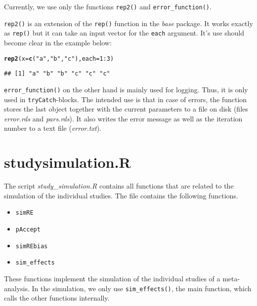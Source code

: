 \documentclass[letterpaper, 12pt]{article}\usepackage[]{graphicx}\usepackage[]{xcolor}
\makeatletter
\newcommand{\hlnum}[1]{\textcolor[rgb]{0.686,0.059,0.569}{#1}}%
\newcommand{\hlstr}[1]{\textcolor[rgb]{0.192,0.494,0.8}{#1}}%
\newcommand{\hlopt}[1]{\textcolor[rgb]{0,0,0}{#1}}%
\newcommand{\hlstd}[1]{\textcolor[rgb]{0.345,0.345,0.345}{#1}}%
\newcommand{\hlkwc}[1]{\textcolor[rgb]{0.333,0.667,0.333}{#1}}%
\newcommand{\hlkwd}[1]{\textcolor[rgb]{0.737,0.353,0.396}{\textbf{#1}}}%
\newenvironment{kframe}{%
 \def\at@end@of@kframe{}%
 \ifinner\ifhmode%
  \def\at@end@of@kframe{\end{minipage}}%
  \begin{minipage}{\columnwidth}%
 \fi\fi%
 \def\FrameCommand##1{\hskip\@totalleftmargin \hskip-\fboxsep
 \colorbox{shadecolor}{##1}\hskip-\fboxsep
     \hskip-\linewidth \hskip-\@totalleftmargin \hskip\columnwidth}%
 \MakeFramed {\advance\hsize-\width
   \@totalleftmargin\z@ \linewidth\hsize
   \@setminipage}}%
 {\par\unskip\endMakeFramed%
 \at@end@of@kframe}
\newenvironment{knitrout}{}{} %
\makeatother
\begin{document}
Currently, we use only the functions \texttt{rep2()} and
\texttt{error\_function()}.

\texttt{rep2()} is an extension of the \texttt{rep()} function in the
\emph{base} package. It works exactly as \texttt{rep()} but it can take an input
vector for the \texttt{each} argument. It's use should become clear in the
example below:

\begin{knitrout}
\color{fgcolor}\begin{kframe}
\begin{alltt}
\hlkwd{rep2}\hlstd{(}\hlkwc{x} \hlstd{=} \hlkwd{c}\hlstd{(}\hlstr{"a"}\hlstd{,} \hlstr{"b"}\hlstd{,} \hlstr{"c"}\hlstd{),} \hlkwc{each} \hlstd{=} \hlnum{1}\hlopt{:}\hlnum{3}\hlstd{)}
\end{alltt}
\begin{verbatim}
## [1] "a" "b" "b" "c" "c" "c"
\end{verbatim}
\end{kframe}
\end{knitrout}

\texttt{error\_function()} on the other hand is mainly used for logging. Thus,
it is only used in \texttt{tryCatch}-blocks. The intended use is that in case of
errors, the function stores the last object together with the current parameters
to a file on disk (files \emph{error.rds} and \emph{pars.rds}). It also writes
the error message as well as the iteration number to a text file
(\emph{error.txt}).

\section{study\textunderscore simulation.R}



The script \emph{study\_simulation.R} contains all functions that are related to
the simulation of the individual studies. The file contains the following functions.

\begin{itemize}
  \item \texttt{simRE}
  \item \texttt{pAccept}
  \item \texttt{simREbias}
  \item \texttt{sim\_effects}
\end{itemize}

These functions implement the simulation of the individual studies of a
meta-analysis. In the simulation, we only use \texttt{sim\_effects()}, the main
function, which calls the other functions internally.
\end{document}
